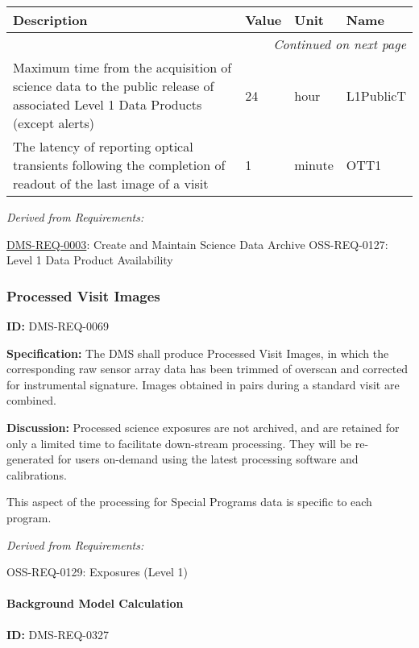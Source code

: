 \documentclass[SE,toc,lsstdraft]{lsstdoc}
\makeatletter
\newcommand{\paramname}[1]{\hspace{0pt}#1}
\newcommand{\unitname}[1]{\hspace{0pt}#1}
\newenvironment{parameters}[0]{%
\setlength\LTleft{0pt}
\setlength\LTright{\fill}
\begin{small}
\begin{longtable}[]{|p{0.5\textwidth}|l|p{0.6in}|p{1.74in}@{}|}

\hline \textbf{Description} & \textbf{Value} & \textbf{Unit} & \textbf{Name} \\ \hline
\endhead

\hline \multicolumn{4}{r}{\emph{Continued on next page}} \\
\endfoot

\hline\hline
\endlastfoot
}{%
\hline
\end{longtable}
\end{small}
}
\makeatother
\begin{document}
\begin{parameters}
Maximum time from the acquisition of science data to the public release of associated Level 1 Data Products (except alerts)
&
24
&
\unitname{%
hour
}
&
\paramname{%
L1PublicT
} \\\hline
The latency of reporting optical transients following the completion of readout of the last image of a visit
&
1
&
\unitname{%
minute
}
&
\paramname{%
OTT1
} \\\hline
\end{parameters}




\emph{Derived from Requirements:}

\hyperref[DMS-REQ-0003]{DMS-REQ-0003}:
Create and Maintain Science Data Archive  \newline
OSS-REQ-0127:
Level 1 Data Product Availability \newline


\subsubsection{Processed Visit Images}

\label{DMS-REQ-0069}
\textbf{ID:} DMS-REQ-0069

\textbf{Specification: }The DMS shall produce Processed Visit Images, in which the corresponding raw sensor array data has been trimmed of overscan and corrected for instrumental signature. Images obtained in pairs during a standard visit are combined.

\textbf{Discussion:} Processed science exposures are not archived, and are retained for only a limited time to facilitate down-stream processing. They will be re-generated for users on-demand using the latest processing software and calibrations.

This aspect of the processing for Special Programs data is specific to each program.




\emph{Derived from Requirements:}

OSS-REQ-0129:
Exposures (Level 1) \newline


\paragraph{Background Model Calculation}\hfill  %

\label{DMS-REQ-0327}
\textbf{ID:} DMS-REQ-0327
\end{document}
